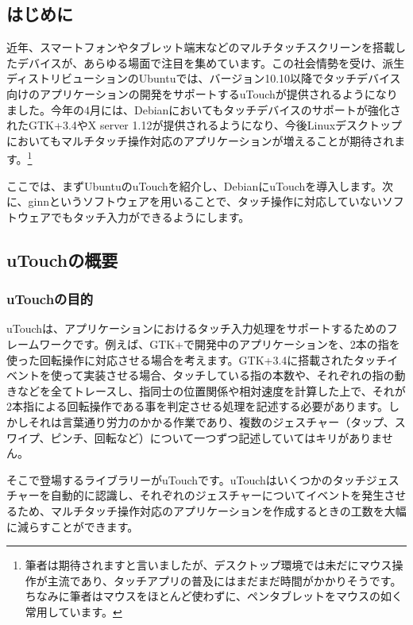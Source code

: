 \documentclass[mingoth,a4paper]{jsarticle}
\begin{document}
\label{sec:multitouch}

\subsection{はじめに}

近年、スマートフォンやタブレット端末などのマルチタッチスクリーンを搭載したデバイスが、あらゆる場面で注目を集めています。この社会情勢を受け、派生ディストリビューションのUbuntuでは、バージョン10.10以降でタッチデバイス向けのアプリケーションの開発をサポートするuTouchが提供されるようになりました。今年の4月には、Debianにおいてもタッチデバイスのサポートが強化されたGTK+3.4やX server 1.12が提供されるようになり、今後Linuxデスクトップにおいてもマルチタッチ操作対応のアプリケーションが増えることが期待されます。\footnote{筆者は期待されますと言いましたが、デスクトップ環境では未だにマウス操作が主流であり、タッチアプリの普及にはまだまだ時間がかかりそうです。ちなみに筆者はマウスをほとんど使わずに、ペンタブレットをマウスの如く常用しています。}

ここでは、まずUbuntuのuTouchを紹介し、DebianにuTouchを導入します。次に、ginnというソフトウェアを用いることで、タッチ操作に対応していないソフトウェアでもタッチ入力ができるようにします。

\subsection{uTouchの概要}

\subsubsection{uTouchの目的}

uTouchは、アプリケーションにおけるタッチ入力処理をサポートするためのフレームワークです。例えば、GTK+で開発中のアプリケーションを、2本の指を使った回転操作に対応させる場合を考えます。GTK+3.4に搭載されたタッチイベントを使って実装させる場合、タッチしている指の本数や、それぞれの指の動きなどを全てトレースし、指同士の位置関係や相対速度を計算した上で、それが2本指による回転操作である事を判定させる処理を記述する必要があります。しかしそれは言葉通り労力のかかる作業であり、複数のジェスチャー（タップ、スワイプ、ピンチ、回転など）について一つずつ記述していてはキリがありません。

そこで登場するライブラリーがuTouchです。uTouchはいくつかのタッチジェスチャーを自動的に認識し、それぞれのジェスチャーについてイベントを発生させるため、マルチタッチ操作対応のアプリケーションを作成するときの工数を大幅に減らすことができます。
\end{document}
